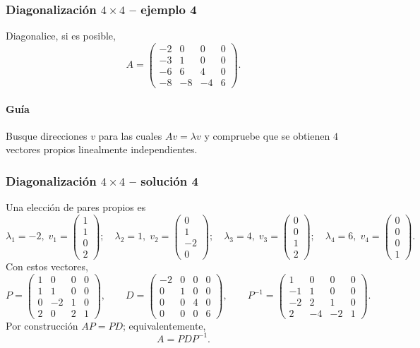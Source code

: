 \subsubsection*{Diagonalización $4\times 4$ -- ejemplo 4}

Diagonalice, si es posible,
\[
A=\begin{pmatrix}-2 & 0 & 0 & 0\\-3 & 1 & 0 & 0\\-6 & 6 & 4 & 0\\-8 & -8 & -4 & 6\end{pmatrix}.
\]

\paragraph{Guía}
Busque direcciones $v$ para las cuales $Av=\lambda v$ y compruebe que se obtienen $4$ vectores propios linealmente independientes.



\subsubsection*{Diagonalización $4\times 4$ -- solución 4}
\scriptsize
Una elección de pares propios es
\[
\lambda_1=-2,\;v_1=\begin{pmatrix}1\\1\\0\\2\end{pmatrix};\quad \lambda_2=1,\;v_2=\begin{pmatrix}0\\1\\-2\\0\end{pmatrix};\quad \lambda_3=4,\;v_3=\begin{pmatrix}0\\0\\1\\2\end{pmatrix};\quad \lambda_4=6,\;v_4=\begin{pmatrix}0\\0\\0\\1\end{pmatrix}.
\]
Con estos vectores,
\[
P=\begin{pmatrix}1 & 0 & 0 & 0\\1 & 1 & 0 & 0\\0 & -2 & 1 & 0\\2 & 0 & 2 & 1\end{pmatrix},\qquad D=\begin{pmatrix}-2 & 0 & 0 & 0\\0 & 1 & 0 & 0\\0 & 0 & 4 & 0\\0 & 0 & 0 & 6\end{pmatrix},\qquad P^{-1}=\begin{pmatrix}1 & 0 & 0 & 0\\-1 & 1 & 0 & 0\\-2 & 2 & 1 & 0\\2 & -4 & -2 & 1\end{pmatrix}.
\]
Por construcción $AP=PD$; equivalentemente,
\[
\boxed{A=PDP^{-1}}.
\]


